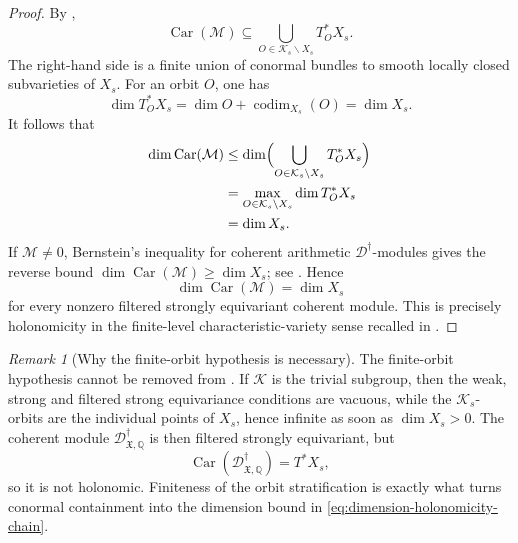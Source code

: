 \documentclass[11pt]{amsart}
\theoremstyle{plain}
\theoremstyle{definition}
\theoremstyle{remark}
\newtheorem{remark}{Remark}[section]
\newcommand{\X}{\mathfrak X}
\newcommand{\DdagX}{\mathscr D^{\dagger}_{\X,\mathbb Q}}
\newcommand{\Car}{\operatorname{Car}}
\begin{document}
\begin{proof}
By ,
\[
  \Car(\mathcal M)
  \subseteq
  \bigcup_{O\in \mathcal K_s\backslash X_s}T^*_O X_s.
\]
The right-hand side is a finite union of conormal bundles to smooth locally
closed subvarieties of \(X_s\).  For an orbit \(O\), one has
\[
  \dim T^*_O X_s
  =\dim O+\operatorname{codim}_{X_s}(O)
  =\dim X_s.
\]
It follows that
\begin{equation}
\label{eq:dimension-holonomicity-chain}
\begin{aligned}
  \dim\Car(\mathcal M)
  &\leq
  \dim\Bigl(\bigcup_{O\in\mathcal K_s\backslash X_s}T^*_O X_s\Bigr) \\
  &=
  \max_{O\in\mathcal K_s\backslash X_s}\dim T^*_O X_s \\
  &=\dim X_s.
\end{aligned}
\end{equation}
If \(\mathcal M\neq0\), Bernstein's inequality for coherent arithmetic
\(\mathscr D^\dagger\)-modules gives the reverse bound
\(\dim\Car(\mathcal M)\geq\dim X_s\); see
\cite[Th\'eor\`eme 2.2.8]{CaroHolonomieSansFrobenius}.  Hence
\[
  \dim\Car(\mathcal M)=\dim X_s
\]
for every nonzero filtered strongly equivariant coherent module.  This is precisely
holonomicity in the finite-level characteristic-variety sense recalled in
\cite[5.3.4--5.3.5]{BerthelotIntro}.
\end{proof}

\begin{remark}[Why the finite-orbit hypothesis is necessary]
\label{rem:finite-orbit-shield}
The finite-orbit hypothesis cannot be removed from .
If \(\mathcal K\) is the trivial subgroup, then the weak, strong and filtered
strong equivariance conditions are vacuous, while the \(\mathcal K_s\)-orbits
are the individual points of \(X_s\), hence infinite as soon as
\(\dim X_s>0\).  The coherent module \(\DdagX\) is then filtered strongly
equivariant, but
\[
  \Car(\DdagX)=T^*X_s,
\]
so it is not holonomic.  Finiteness of the orbit stratification is exactly what
turns conormal containment into the dimension bound in
\eqref{eq:dimension-holonomicity-chain}.
\end{remark}
\end{document}
